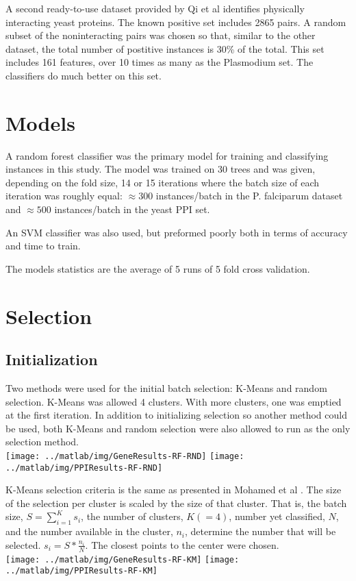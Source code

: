 \documentclass[10pt,a4pape r]{article}
\begin{document}
A second ready-to-use dataset provided by Qi et al\cite{qi} identifies physically interacting yeast proteins. The known positive set includes 2865 pairs. A random subset of the noninteracting pairs was chosen so that, similar to the other dataset, the total number of postitive instances is 30\% of the total. This set includes 161 features, over 10 times as many as the Plasmodium set. The classifiers do much better on this set.

\section{Models}
A random forest classifier\cite{rf} was the primary model for training and classifying instances in this study. The model was trained on 30 trees and was given, depending on the fold size, 14 or 15 iterations where the batch size of each iteration was roughly equal: $\approx 300$ instances/batch in the P. falciparum dataset and $\approx 500$ instances/batch in the yeast PPI set.

An SVM classifier was also used, but preformed poorly both in terms of accuracy and time to train.  

The models statistics are the average of 5 runs of 5 fold cross validation.

\section{Selection}
\subsection{Initialization}
Two methods were used for the initial batch selection: K-Means and random selection. K-Means was allowed 4 clusters. With more clusters, one was emptied at the first iteration. In addition to initializing selection so another method could be used, both K-Means and random selection were also allowed to run as the only selection method. \\
\texttt{[image: ../matlab/img/GeneResults-RF-RND]} \texttt{[image: ../matlab/img/PPIResults-RF-RND]}

K-Means selection criteria is the same as presented in Mohamed et al \cite{mohamed}. The size of the selection per cluster is scaled by the size of that cluster. That is, the batch size, $S = \sum_{i=1}^{K} s_{i}$, the number of clusters, $K(=4)$, number yet classified, $N$, and the number available in the cluster, $n_i$, determine the number that will be selected.  $s_i = S * \frac{n_i}{N}$. The closest points to the center were chosen.\\
\texttt{[image: ../matlab/img/GeneResults-RF-KM]} \texttt{[image: ../matlab/img/PPIResults-RF-KM]}
\end{document}
